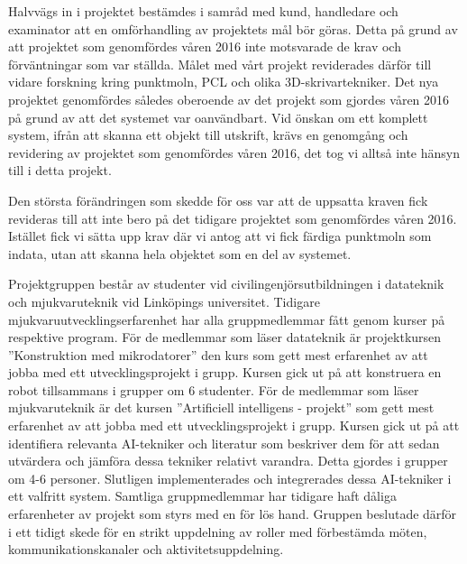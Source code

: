 Halvvägs in i projektet bestämdes i samråd med kund, handledare och examinator att en omförhandling av projektets mål bör göras. Detta på grund av att projektet som genomfördes våren 2016 inte motsvarade de krav och förväntningar som var ställda. Målet med vårt projekt reviderades därför till vidare forskning kring punktmoln, PCL och olika 3D-skrivartekniker. Det nya projektet genomfördes således oberoende av det projekt som gjordes våren 2016 på grund av att det systemet var oanvändbart. Vid önskan om ett komplett system, ifrån att skanna ett objekt till utskrift, krävs en genomgång och revidering av projektet som genomfördes våren 2016, det tog vi alltså inte hänsyn till i detta projekt.

Den största förändringen som skedde för oss var att de uppsatta kraven fick revideras till att inte bero på det tidigare projektet som genomfördes våren 2016. Istället fick vi sätta upp krav där vi antog att vi fick färdiga punktmoln som indata, utan att skanna hela objektet som en del av systemet.

Projektgruppen består av studenter vid civilingenjörsutbildningen i datateknik och mjukvaruteknik vid Linköpings universitet. Tidigare mjukvaruutvecklingserfarenhet har alla gruppmedlemmar fått genom kurser på respektive program. För de medlemmar som läser datateknik är projektkursen ”Konstruktion med mikrodatorer” den kurs som gett mest erfarenhet av att jobba med ett utvecklingsprojekt i grupp. Kursen gick ut på att konstruera en robot tillsammans i grupper om 6 studenter. För de medlemmar som läser mjukvaruteknik är det kursen ”Artificiell intelligens - projekt” som gett mest erfarenhet av att jobba med ett utvecklingsprojekt i grupp. Kursen gick ut på att identifiera relevanta AI-tekniker och literatur som beskriver dem för att sedan utvärdera och jämföra dessa tekniker relativt varandra. Detta gjordes i grupper om 4-6 personer. Slutligen implementerades och integrerades dessa AI-tekniker i ett valfritt system. Samtliga gruppmedlemmar har tidigare haft dåliga erfarenheter av projekt som styrs med en för lös hand. Gruppen beslutade därför i ett tidigt skede för en strikt uppdelning av roller med förbestämda möten, kommunikationskanaler och aktivitetsuppdelning.

